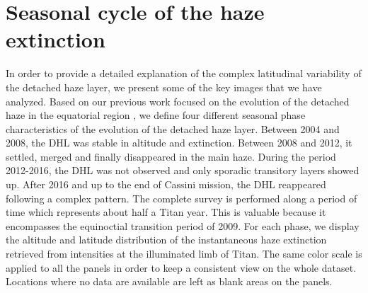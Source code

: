 \section{Seasonal cycle of the haze extinction}

In order to provide a detailed explanation of the complex latitudinal variability of the detached haze layer, we present
some of the key images that we have analyzed. Based on our previous work focused on the evolution of the detached haze in the
equatorial region \citep{West2018}, we define four different seasonal phase characteristics of the evolution of the detached haze layer.
Between 2004 and 2008, the DHL was stable in altitude and extinction.
Between 2008 and 2012, it settled, merged and finally disappeared in the main haze.
During the period 2012-2016, the DHL was not observed and only sporadic transitory layers showed up.
After 2016 and up to the end of Cassini mission, the DHL reappeared following a complex pattern.
The complete survey is performed along a period of time which represents about half a Titan year.
This is valuable because it encompasses the equinoctial transition period of 2009.
For each phase, we display the altitude and latitude distribution of the instantaneous haze extinction retrieved from intensities at the illuminated limb of Titan.
The same color scale is applied to all the panels in order to keep a consistent view on the whole dataset.
Locations where no data are available are left as blank areas on the panels.




